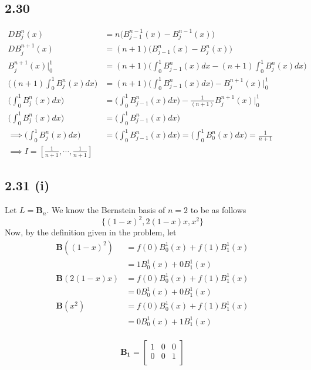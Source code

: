 \documentclass[letterpaper,12pt]{article}
\theoremstyle{definition}
\begin{document}
\subsection*{2.30}
\begin{align*}
    DB_j^n(x) &= n \Big( B^{n-1}_{j-1} (x) - B^{n-1}_j (x)  \Big) \\
    DB_j^{n+1}(x) &= (n + 1) \Big( B^{n}_{j-1} (x) - B^{n}_j (x)  \Big) \\
    B_j^{n+1}(x) \Big|_0^1 &= (n + 1) \Big(\int^{1}_{0} B^{n}_{j-1} (x)dx -(n+1)\int^{1}_{0} B^{n}_j (x) dx  \Big) \\
    \Big((n+1)\int^{1}_{0} B^{n}_j (x) dx  \Big) &= (n + 1) \Big(\int^{1}_{0} B^{n}_{j-1} (x)dx\Big)  - B_j^{n+1}(x) \Big|_0^1 \\
    \Big(\int^{1}_{0} B^{n}_j (x) dx  \Big) &=  \Big(\int^{1}_{0} B^{n}_{j-1} (x)dx\Big)  -\frac{1}{(n+1)} B_j^{n+1}(x) \Big|_0^1 \\
    \Big(\int^{1}_{0} B^{n}_j (x) dx  \Big) &=  \Big(\int^{1}_{0} B^{n}_{j-1} (x)dx \Big)  \\
    \implies 
    \Big(\int^{1}_{0} B^{n}_j (x) dx \Big) &=  \Big(\int^{1}_{0} B^{n}_{j-1} (x)dx\Big) = \Big(\int^{1}_{0} B^{n}_0 (x) dx \Big) = \frac{1}{n+1} \\
    \implies 
    I = [\frac{1}{n+1}, \cdots, \frac{1}{n+1}]
\end{align*}

\subsection*{2.31 (i)}
Let $L = \mathbf{B}_n$.
We know the Bernstein basis of $n=2$ to be as follows
\[ \{(1-x)^2, 2(1-x)x, x^2\} \]
Now, by the definition given in the problem, let
\begin{align*}
    \mathbf{B}  ( (1-x)^2) &= f(0) B_0^1(x)+ f(1) B_1^1(x)\\
 &= 1 B_0^1(x)+ 0 B_1^1(x)\\
    \mathbf{B} ( 2(1-x)x) &= f(0) B_0^1(x)+ f(1) B_1^1(x)\\
 &= 0 B_0^1(x)+ 0 B_1^1(x)\\
    \mathbf{B} ( x^2) &= f(0) B_0^1(x)+ f(1) B_1^1(x)\\
 &= 0 B_0^1(x)+ 1 B_1^1(x)\\
\end{align*}

\[ \mathbf{B_1}  = 
\begin{bmatrix}
    1 & 0 & 0 \\
    0 & 0 & 1 \\
\end{bmatrix}
\]
\end{document}

